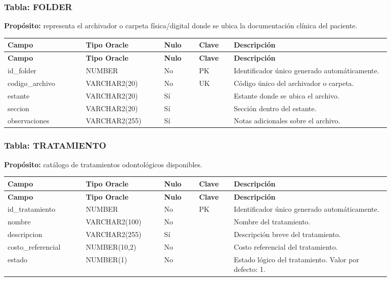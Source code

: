 \subsubsection{Tabla: FOLDER}

\textbf{Propósito:} representa el archivador o carpeta física/digital donde se ubica la documentación clínica del paciente.\par

\begin{longtable}{p{0.18\linewidth}p{0.18\linewidth}p{0.08\linewidth}p{0.08\linewidth}p{0.36\linewidth}}
\toprule
\textbf{Campo} & \textbf{Tipo Oracle} & \textbf{Nulo} & \textbf{Clave} & \textbf{Descripción} \\
\midrule
\endfirsthead
\toprule
\textbf{Campo} & \textbf{Tipo Oracle} & \textbf{Nulo} & \textbf{Clave} & \textbf{Descripción} \\
\midrule
\endhead
id\_folder & NUMBER & No & PK & Identificador único generado automáticamente. \\
codigo\_archivo & VARCHAR2(20) & No & UK & Código único del archivador o carpeta. \\
estante & VARCHAR2(20) & Sí &  & Estante donde se ubica el archivo. \\
seccion & VARCHAR2(20) & Sí &  & Sección dentro del estante. \\
observaciones & VARCHAR2(255) & Sí &  & Notas adicionales sobre el archivo. \\
\bottomrule
\end{longtable}



\subsubsection{Tabla: TRATAMIENTO}

\textbf{Propósito:} catálogo de tratamientos odontológicos disponibles.\par

\begin{longtable}{p{0.18\linewidth}p{0.18\linewidth}p{0.08\linewidth}p{0.08\linewidth}p{0.36\linewidth}}
\toprule
\textbf{Campo} & \textbf{Tipo Oracle} & \textbf{Nulo} & \textbf{Clave} & \textbf{Descripción} \\
\midrule
\endfirsthead
\toprule
\textbf{Campo} & \textbf{Tipo Oracle} & \textbf{Nulo} & \textbf{Clave} & \textbf{Descripción} \\
\midrule
\endhead
id\_tratamiento & NUMBER & No & PK & Identificador único generado automáticamente. \\
nombre & VARCHAR2(100) & No &  & Nombre del tratamiento. \\
descripcion & VARCHAR2(255) & Sí &  & Descripción breve del tratamiento. \\
costo\_referencial & NUMBER(10,2) & No &  & Costo referencial del tratamiento. \\
estado & NUMBER(1) & No &  & Estado lógico del tratamiento. Valor por defecto: 1. \\
\bottomrule
\end{longtable}



